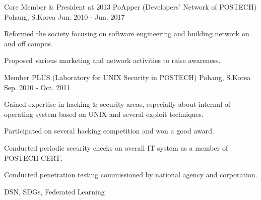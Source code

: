 

\begin{cventries}

  \cventry
    {Core Member \& President at 2013} %
    {PoApper (Developers' Network of POSTECH)} %
    {Pohang, S.Korea} %
    {Jun. 2010 - Jun. 2017} %
    {
      \begin{cvitems} %
        \item {Reformed the society focusing on software engineering and building network on and off campus.}
        \item {Proposed various marketing and network activities to raise awareness.}
      \end{cvitems}
    }

  \cventry
    {Member} %
    {PLUS (Laboratory for UNIX Security in POSTECH)} %
    {Pohang, S.Korea} %
    {Sep. 2010 - Oct. 2011} %
    {
      \begin{cvitems} %
        \item {Gained expertise in hacking \& security areas, especially about internal of operating system based on UNIX and several exploit techniques.}
        \item {Participated on several hacking competition and won a good award.}
        \item {Conducted periodic security checks on overall IT system as a member of POSTECH CERT.}
        \item {Conducted penetration testing commissioned by national agency and corporation.}
        \item {DSN, SDGs, Federated Learning}
      \end{cvitems}
    }

\end{cventries}
